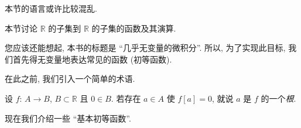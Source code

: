 \begin{remark*}
    本节的语言或许比较混乱.
\end{remark*}

本节讨论 $\mathbb{R}$ 的子集到 $\mathbb{R}$ 的子集的函数及其演算.

您应该还能想起, 本书的标题是 ``几乎无变量的微积分''. 所以, 为了实现此目标, 我们首先得无变量地表达常见的函数 (初等函数).

在此之前, 我们引入一个简单的术语.

\begin{definition}
    设 $f$: $A \to B$, $B \subset \mathbb{R}$ 且 $0 \in B$. 若存在 $a \in A$ 使 $f[a] = 0$, 就说 $a$ 是 $f$ 的一个\emph{根}.
\end{definition}

现在我们介绍一些 ``基本初等函数''.

